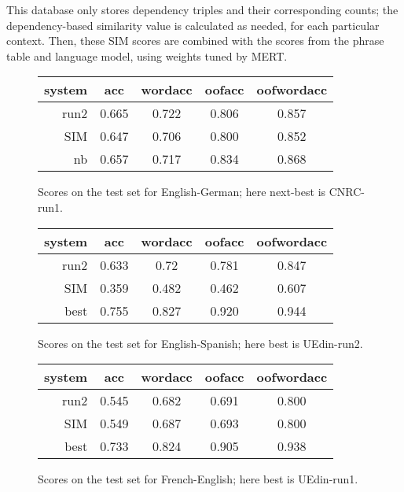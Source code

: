 \documentclass[11pt]{article}
\begin{document}
This database only stores dependency triples and their corresponding counts;
the dependency-based similarity value is calculated as needed, for each
particular context. Then, these SIM scores are combined with the scores from the
phrase table and language model, using weights tuned by MERT.

\begin{figure}[t]
  \begin{center}
  \begin{tabular}{|r|c|c|c|c|}
    \hline
    system & acc      & wordacc  & oofacc & oofwordacc \\
    \hline
    run2  &  0.665 & 0.722  &  0.806  & 0.857 \\
    SIM    &  0.647 & 0.706 & 0.800 & 0.852 \\
    nb     &  0.657   & 0.717   & 0.834 & 0.868    \\
    \hline
  \end{tabular}
  \end{center}
\caption{Scores on the test set for English-German; here next-best is CNRC-run1.}
\label{fig:theresults-en-de}
\end{figure}

\begin{figure}[t]
  \begin{center}
  \begin{tabular}{|r|c|c|c|c|}
    \hline
    system & acc      & wordacc  & oofacc & oofwordacc \\
    \hline
    run2  &  0.633 & 0.72 & 0.781 & 0.847 \\
    SIM    &  0.359 &  0.482 & 0.462 & 0.607 \\
    best   &  0.755 & 0.827   & 0.920  & 0.944 \\
    \hline
  \end{tabular}
  \end{center}
\caption{Scores on the test set for English-Spanish; here best is UEdin-run2.}
\label{fig:theresults-en-es}
\end{figure}

\begin{figure}[t]
  \begin{center}
  \begin{tabular}{|r|c|c|c|c|}
    \hline
    system & acc      & wordacc  & oofacc & oofwordacc \\
    \hline
    run2  & 0.545  & 0.682 & 0.691 & 0.800 \\
    SIM        &  0.549 & 0.687 & 0.693 & 0.800 \\
    best & 0.733 & 0.824 & 0.905 & 0.938 \\
    \hline
  \end{tabular}
  \end{center}
\caption{Scores on the test set for French-English; here best is UEdin-run1.}
\label{fig:theresults-fr-en}
\end{figure}
\end{document}
